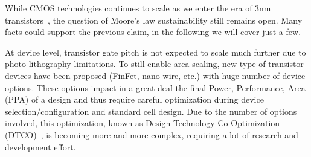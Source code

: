 \documentclass[conference]{IEEEtran}
\begin{document}
While CMOS technologies continues to scale as we enter the era of 3nm transistors~\cite{imec3nm}, the question of Moore's law sustainability still remains open. Many facts could support the previous claim, in the following we will cover just a few.

At device level, transistor gate pitch is not expected to scale much further due to photo-lithography limitations. To still enable area scaling, new type of transistor devices have been proposed (FinFet, nano-wire, etc.) with huge number of device options. These options impact in a great deal the final Power, Performance, Area (PPA) of a design and thus require careful optimization during device selection/configuration and standard cell design. Due to the number of options involved, this optimization, known as Design-Technology Co-Optimization (DTCO)~\cite{Mattii2017}, is becoming more and more complex, requiring a lot of research and development effort.
\end{document}
